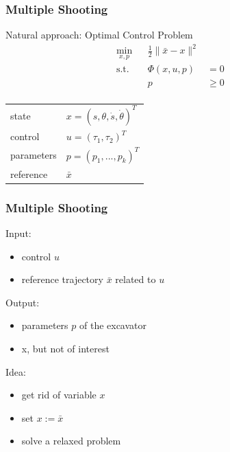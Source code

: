 \begin{frame}
    \frametitle{Multiple Shooting}
    Natural approach: Optimal Control Problem
    \begin{align*}
        \min_{x,p} & & \frac{1}{2} \| \bar{x} - x \|^2 & & \\
        \operatorname{s.t.} & & \Phi(x,u,p) & = 0 & & \\
                            & & p & \geq 0 & & \\
    \end{align*}

    \begin{tabular}{ll}
        state & $ x = (s,\theta,\dot{s},\dot{\theta})^T $ \\
        control & $ u = (\tau_1,\tau_2)^T $ \\
        parameters & $ p = (p_1,...,p_k)^T $ \\
        reference & $\bar{x}$ \\
    \end{tabular}
\end{frame}

\begin{frame}
    \frametitle{Multiple Shooting}
    Input:
    \begin{itemize}
        \item{control $u$}
        \item{reference trajectory $\bar{x}$ related to $u$}
    \end{itemize}

    Output:
    \begin{itemize}
        \item{parameters $p$ of the excavator}
        \item{x, but not of interest}
    \end{itemize}

    Idea:
    \begin{itemize}
        \item{get rid of variable $x$}
        \item{set $x := \bar{x}$}
        \item{solve a relaxed problem}
    \end{itemize}
\end{frame}

